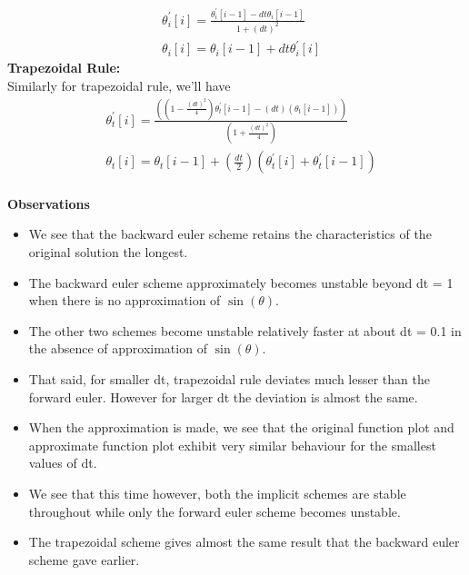 \documentclass[letterpaper]{exam}
\begin{document}
\begin{questions}
\begin{solution}
\begin{align}
    &\theta^{'}_i[i] = \frac{\theta^{'}_i[i-1] - dt\theta_i[i-1]}{1+(dt)^{2}}\\
    &\theta_i[i] = \theta_i[i-1] + dt\theta^{'}_i[i]
\end{align}
\textbf{Trapezoidal Rule:}\\
Similarly for trapezoidal rule, we'll have
\begin{align}
    &\theta^{'}_t[i] = \frac{((1-\frac{(dt)^2}{4})\theta^{'}_t[i-1] - (dt)(\theta_t[i-1]))}{(1 + \frac{(dt)^2}{4})}\\
    &\theta_t[i] = \theta_t[i-1] + (\frac{dt}{2})(\theta^{'}_t[i]+\theta^{'}_t[i-1])
\end{align}
\\
\textbf{Observations}
\begin{itemize}
    \item We see that the backward euler scheme retains the characteristics of the original solution the longest.
    \item The backward euler scheme approximately becomes unstable beyond dt = 1 when there is no approximation of $\sin{(\theta)}$.
    \item The other two schemes become unstable relatively faster at about dt = 0.1 in the absence of approximation of $\sin{(\theta)}$.
    \item That said, for smaller dt, trapezoidal rule deviates much lesser than the forward euler. However for larger dt the deviation is almost the same.
    \item When the approximation is made, we see that the original function plot and approximate function plot exhibit very similar behaviour for the smallest values of dt.
    \item We see that this time however, both the implicit schemes are stable throughout while only the forward euler scheme becomes unstable.
    \item The trapezoidal scheme gives almost the same result that the backward euler scheme gave earlier.
\end{itemize}
\end{solution}
\end{questions}
\end{document}
